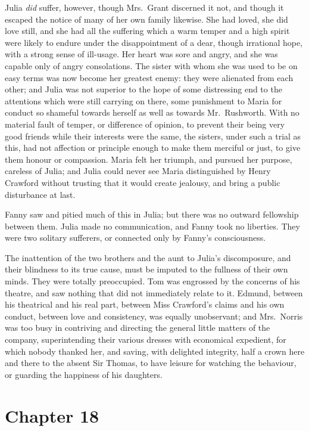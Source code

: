 Julia \emph{did} suffer, however, though Mrs.\ Grant discerned
it not, and though it escaped the notice of many of her
own family likewise.  She had loved, she did love still,
and she had all the suffering which a warm temper and a
high spirit were likely to endure under the disappointment
of a dear, though irrational hope, with a strong sense
of ill-usage. Her heart was sore and angry, and she
was capable only of angry consolations.  The sister
with whom she was used to be on easy terms was now become
her greatest enemy:  they were alienated from each other;
and Julia was not superior to the hope of some distressing
end to the attentions which were still carrying on there,
some punishment to Maria for conduct so shameful towards
herself as well as towards Mr.\ Rushworth.  With no material
fault of temper, or difference of opinion, to prevent
their being very good friends while their interests
were the same, the sisters, under such a trial as this,
had not affection or principle enough to make them merciful
or just, to give them honour or compassion.  Maria felt
her triumph, and pursued her purpose, careless of Julia;
and Julia could never see Maria distinguished by Henry
Crawford without trusting that it would create jealousy,
and bring a public disturbance at last.

Fanny saw and pitied much of this in Julia; but there
was no outward fellowship between them.  Julia made
no communication, and Fanny took no liberties.  They were
two solitary sufferers, or connected only by Fanny's consciousness.

The inattention of the two brothers and the aunt to
Julia's discomposure, and their blindness to its true cause,
must be imputed to the fullness of their own minds.
They were totally preoccupied.  Tom was engrossed by
the concerns of his theatre, and saw nothing that did
not immediately relate to it.  Edmund, between his
theatrical and his real part, between Miss Crawford's
claims and his own conduct, between love and consistency,
was equally unobservant; and Mrs.\ Norris was too busy
in contriving and directing the general little matters
of the company, superintending their various dresses
with economical expedient, for which nobody thanked her,
and saving, with delighted integrity, half a crown here and
there to the absent Sir Thomas, to have leisure for watching
the behaviour, or guarding the happiness of his daughters.



\chapter{Chapter 18}

